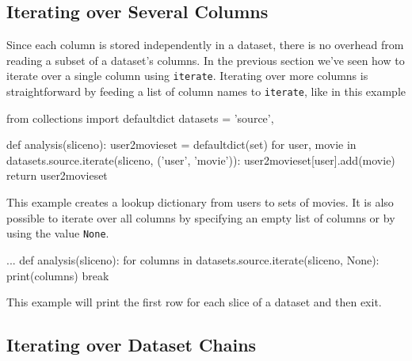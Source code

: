 \documentclass[a4paper]{article}
\begin{document}
\clearpage




\subsection{Iterating over Several Columns}
Since each column is stored independently in a dataset, there is no
overhead from reading a subset of a dataset's columns.  In the
previous section we've seen how to iterate over a single column using
\texttt{iterate}.  Iterating over more columns is straightforward by
feeding a list of column names to \texttt{iterate}, like in this
example
\begin{python}
from collections import defaultdict
datasets = {'source',}

def analysis(sliceno):
  user2movieset = defaultdict(set)
  for user, movie in datasets.source.iterate(sliceno, ('user', 'movie')):
    user2movieset[user].add(movie)
  return user2movieset
\end{python}
This example creates a lookup dictionary from users to sets of movies.
It is also possible to iterate over all columns by specifying an empty
list of columns or by using the value \texttt{None}.
\begin{python}
...
def analysis(sliceno):
  for columns in datasets.source.iterate(sliceno, None):
    print(columns)
    break
\end{python}
This example will print the first row for each slice of a dataset and
then exit.

\clearpage




\subsection{Iterating over Dataset Chains}
\end{document}

